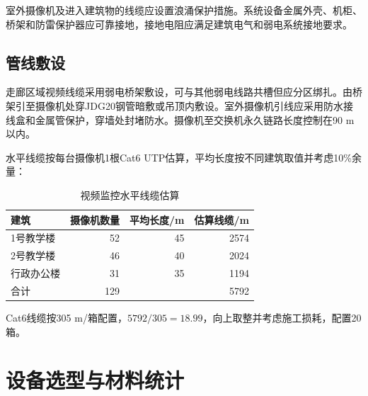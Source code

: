 \documentclass[UTF8,zihao=-4,openany]{ctexrep}
\begin{document}
室外摄像机及进入建筑物的线缆应设置浪涌保护措施。系统设备金属外壳、机柜、桥架和防雷保护器应可靠接地，接地电阻应满足建筑电气和弱电系统接地要求。

\section{管线敷设}
走廊区域视频线缆采用弱电桥架敷设，可与其他弱电线路共槽但应分区绑扎。由桥架引至摄像机处穿JDG20钢管暗敷或吊顶内敷设。室外摄像机引线应采用防水接线盒和金属管保护，穿墙处封堵防水。摄像机至交换机永久链路长度控制在90 m以内。

水平线缆按每台摄像机1根Cat6 UTP估算，平均长度按不同建筑取值并考虑10\%余量：
\begin{table}[H]
\centering
\caption{视频监控水平线缆估算}
\begin{tabular}{lrrr}
\toprule
建筑&摄像机数量&平均长度/m&估算线缆/m\\
\midrule
1号教学楼&52&45&2574\\
2号教学楼&46&40&2024\\
行政办公楼&31&35&1194\\
\midrule
合计&129&&5792\\
\bottomrule
\end{tabular}
\end{table}

Cat6线缆按305 m/箱配置，$5792/305=18.99$，向上取整并考虑施工损耗，配置20箱。

\chapter{设备选型与材料统计}
\end{document}
